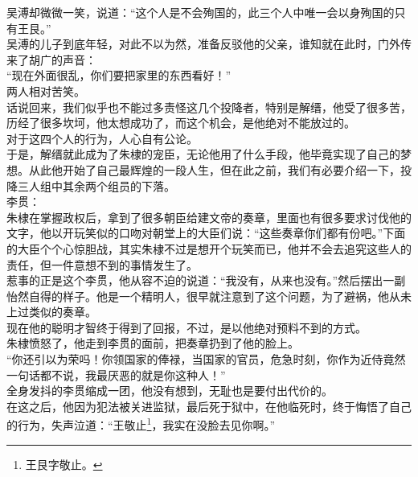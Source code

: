 \begin{multicols}{\theparacolNo}
吴溥却微微一笑，说道：“这个人是不会殉国的，此三个人中唯一会以身殉国的只有王艮。”\\

吴溥的儿子到底年轻，对此不以为然，准备反驳他的父亲，谁知就在此时，门外传来了胡广的声音：\\

“现在外面很乱，你们要把家里的东西看好！”\\

两人相对苦笑。\\

话说回来，我们似乎也不能过多责怪这几个投降者，特别是解缙，他受了很多苦，历经了很多坎坷，他太想成功了，而这个机会，是他绝对不能放过的。\\

对于这四个人的行为，人心自有公论。\\

于是，解缙就此成为了朱棣的宠臣，无论他用了什么手段，他毕竟实现了自己的梦想。从此他开始了自己最辉煌的一段人生，但在此之前，我们有必要介绍一下，投降三人组中其余两个组员的下落。\\

李贯：\\

朱棣在掌握政权后，拿到了很多朝臣给建文帝的奏章，里面也有很多要求讨伐他的文字，他以开玩笑似的口吻对朝堂上的大臣们说：“这些奏章你们都有份吧。”下面的大臣个个心惊胆战，其实朱棣不过是想开个玩笑而已，他并不会去追究这些人的责任，但一件意想不到的事情发生了。\\

惹事的正是这个李贯，他从容不迫的说道：“我没有，从来也没有。”然后摆出一副怡然自得的样子。他是一个精明人，很早就注意到了这个问题，为了避祸，他从未上过类似的奏章。\\

现在他的聪明才智终于得到了回报，不过，是以他绝对预料不到的方式。\\

朱棣愤怒了，他走到李贯的面前，把奏章扔到了他的脸上。\\

“你还引以为荣吗！你领国家的俸禄，当国家的官员，危急时刻，你作为近侍竟然一句话都不说，我最厌恶的就是你这种人！”\\

全身发抖的李贯缩成一团，他没有想到，无耻也是要付出代价的。\\

在这之后，他因为犯法被关进监狱，最后死于狱中，在他临死时，终于悔悟了自己的行为，失声泣道：“王敬止\footnote{王艮字敬止。}，我实在没脸去见你啊。”\\


\end{multicols}
